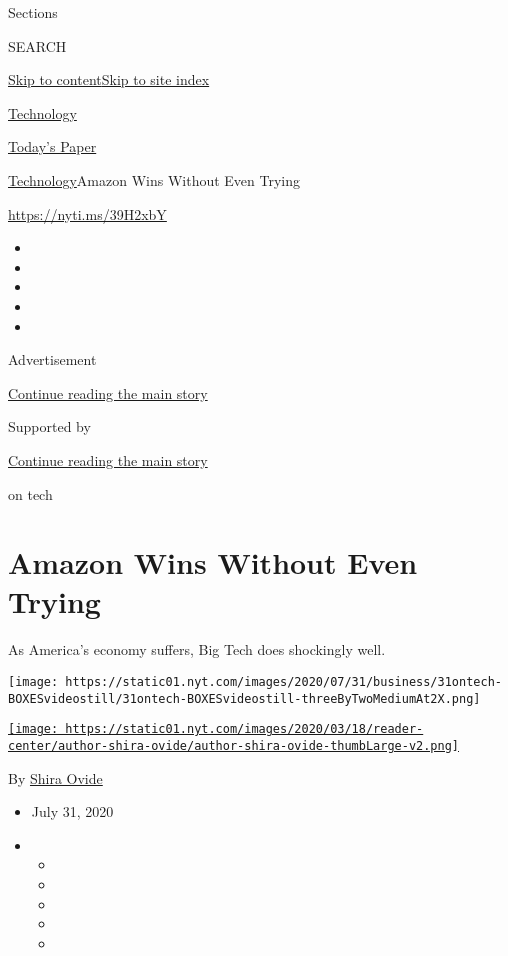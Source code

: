 Sections

SEARCH

\protect\hyperlink{site-content}{Skip to
content}\protect\hyperlink{site-index}{Skip to site index}

\href{https://www.nytimes.com/section/technology}{Technology}

\href{https://myaccount.nytimes.com/auth/login?response_type=cookie\&client_id=vi}{}

\href{https://www.nytimes.com/section/todayspaper}{Today's Paper}

\href{/section/technology}{Technology}\textbar{}Amazon Wins Without Even
Trying

\url{https://nyti.ms/39H2xbY}

\begin{itemize}
\item
\item
\item
\item
\item
\end{itemize}

Advertisement

\protect\hyperlink{after-top}{Continue reading the main story}

Supported by

\protect\hyperlink{after-sponsor}{Continue reading the main story}

on tech

\hypertarget{amazon-wins-without-even-trying}{%
\section{Amazon Wins Without Even
Trying}\label{amazon-wins-without-even-trying}}

As America's economy suffers, Big Tech does shockingly well.

\texttt{[image: https://static01.nyt.com/images/2020/07/31/business/31ontech-BOXESvideostill/31ontech-BOXESvideostill-threeByTwoMediumAt2X.png]}

\href{https://www.nytimes.com/by/shira-ovide}{\texttt{[image: https://static01.nyt.com/images/2020/03/18/reader-center/author-shira-ovide/author-shira-ovide-thumbLarge-v2.png]}}

By \href{https://www.nytimes.com/by/shira-ovide}{Shira Ovide}

\begin{itemize}
\item
  July 31, 2020
\item
  \begin{itemize}
  \item
  \item
  \item
  \item
  \item
  \end{itemize}
\end{itemize}


